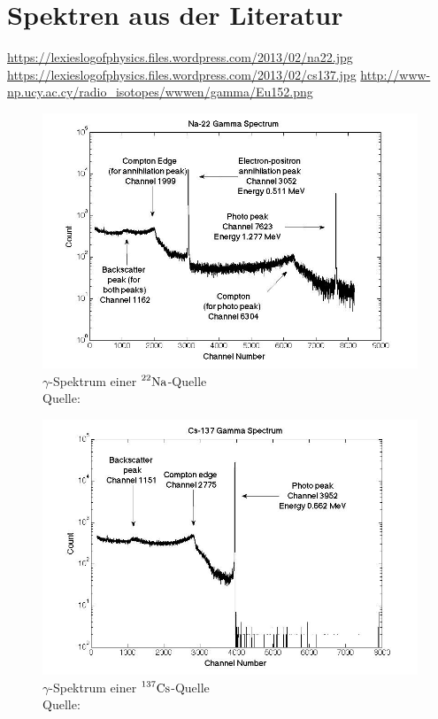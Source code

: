 \section{Spektren aus der Literatur}
\label{sec:ref-spektren}
	
	\url{https://lexieslogofphysics.files.wordpress.com/2013/02/na22.jpg}
	\url{https://lexieslogofphysics.files.wordpress.com/2013/02/cs137.jpg}
	\url{http://www-np.ucy.ac.cy/radio_isotopes/wwwen/gamma/Eu152.png}

	\begin{figure}[hp]
		\centering
		\includegraphics[scale=0.3]{ref/na22.jpg}
		\caption{$\gamma$-Spektrum einer $\prescript{22}{}{\mathrm{Na}}$-Quelle \\ Quelle: }
		\label{fig:ref-na-22}
	\end{figure}
	\begin{figure}[hp]
		\centering
		\includegraphics[scale=0.3]{ref/cs137.jpg}
		\caption{$\gamma$-Spektrum einer $\prescript{137}{}{\mathrm{Cs}}$-Quelle \\ Quelle: }
		\label{fig:ref-cs-137}
	\end{figure}
